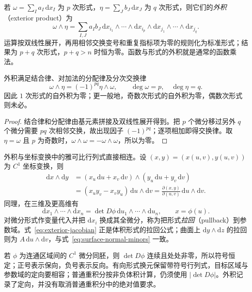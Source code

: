\documentclass[UTF8,12pt,a4paper,fontset=fandol]{ctexbook}
\begin{document}
\begin{definition}
\label{def:exterior-product}
若 $\omega=\sum_Ia_I\,\mathrm dx_I$ 为 $p$ 次形式，$\eta=\sum_Jb_J\,\mathrm dx_J$ 为 $q$ 次形式，则它们的\emph{外积}（exterior product）为
\[
    \omega\wedge\eta=\sum_{I,J}a_Ib_J\,
    \mathrm dx_{i_1}\wedge\cdots\wedge\mathrm dx_{i_p}
    \wedge\mathrm dx_{j_1}\wedge\cdots\wedge\mathrm dx_{j_q}.
\]
运算按双线性展开，再用相邻交换变号和重复指标项为零的规则化为标准形式；结果为 $p+q$ 次形式，$p+q>n$ 时恒为零。函数与形式的外积就是通常的函数乘法。
\end{definition}

\begin{proposition}
\label{prop:exterior-product-rules}
外积满足结合律、对加法的分配律及分次交换律
\[
    \omega\wedge\eta=(-1)^{pq}\eta\wedge\omega,
    \qquad \deg\omega=p,\quad\deg\eta=q.
\]
因此 $1$ 次形式的自外积为零；更一般地，奇数次形式的自外积为零，偶数次形式则未必。
\end{proposition}
\begin{proof}
结合律和分配律由基元素拼接及双线性展开得到。把 $p$ 个微分移过另外 $q$ 个微分需要 $pq$ 次相邻交换，故出现因子 $(-1)^{pq}$；逐项相加即得交换律。取 $\eta=\omega$ 且 $p$ 为奇数时，$\omega\wedge\omega=-\omega\wedge\omega$，所以为零。
\end{proof}

外积与坐标变换中的雅可比行列式直接相连。设 $(x,y)=(x(u,v),y(u,v))$ 为 $C^1$ 坐标变换，则
\begin{align*}
    \mathrm dx\wedge\mathrm dy
    &=(x_u\,\mathrm du+x_v\,\mathrm dv)\wedge(y_u\,\mathrm du+y_v\,\mathrm dv)\\
    &=(x_uy_v-x_vy_u)\,\mathrm du\wedge\mathrm dv
     =\frac{\partial(x,y)}{\partial(u,v)}\,\mathrm du\wedge\mathrm dv.
\end{align*}
同理，在三维及更高维有
\begin{equation}
\label{eq:exterior-jacobian}
    \mathrm dx_1\wedge\cdots\wedge\mathrm dx_n
    =\det D\phi\,\mathrm du_1\wedge\cdots\wedge\mathrm du_n,
    \qquad x=\phi(u).
\end{equation}
对微分形式作变量代入并把 $\mathrm dx_i$ 换成其全微分，称为把形式\emph{拉回}（pullback）到参数域。式~\eqref{eq:exterior-jacobian} 正是体积形式的拉回公式；曲面上 $\mathrm dy\wedge\mathrm dz$ 的拉回则为 $A\,\mathrm du\wedge\mathrm dv$，与式~\eqref{eq:surface-normal-minors} 一致。

若 $\phi$ 为连通区域间的 $C^1$ 微分同胚，则 $\det D\phi$ 连续且处处非零，所以符号恒定；正号表示保向，负号表示反向。有向形式换元保留带符号行列式，目标区域与参数域的定向要相容；普通重积分按非负体积计算，仍须使用 $|\det D\phi|$。外积记录了定向，并没有取消普通重积分中的绝对值要求。
\end{document}

